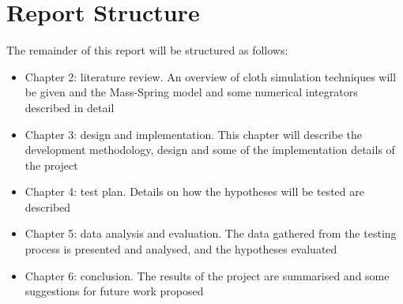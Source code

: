 \section{Report Structure}
The remainder of this report will be structured as follows:
\begin{itemize}
  \item{Chapter 2: literature review. An overview of cloth simulation techniques will be given and the Mass-Spring model and some numerical integrators described in detail}
  \item{Chapter 3: design and implementation. This chapter will describe the development methodology, design and some of the implementation details of the project}
  \item{Chapter 4: test plan. Details on how the hypotheses will be tested are described}
  \item{Chapter 5: data analysis and evaluation. The data gathered from the testing process is presented and analysed, and the hypotheses evaluated}
  \item{Chapter 6: conclusion. The results of the project are summarised and some suggestions for future work proposed}
\end{itemize}

